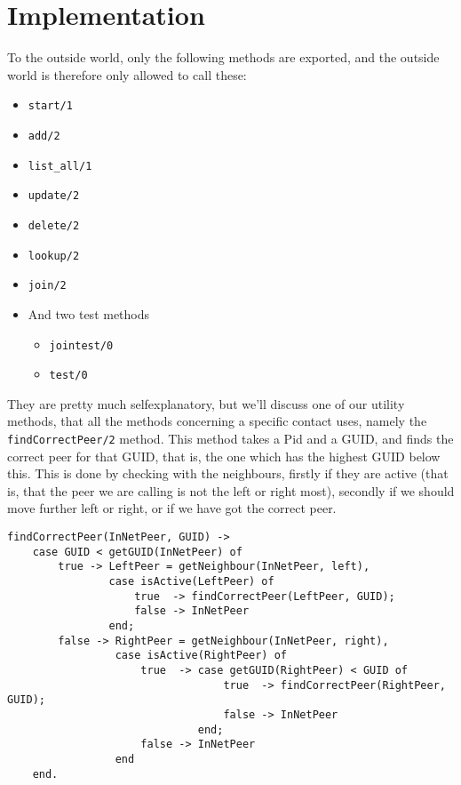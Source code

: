 \documentclass[10pt, a4paper]{article}
\begin{document}
\section{Implementation} %
\label{sec:implementation}
To the outside world, only the following methods are exported, and the outside world is therefore only allowed to call these:
\begin{itemize}
	\item \texttt{start/1}
	\item \texttt{add/2}
	\item \texttt{list\_all/1}
	\item \texttt{update/2}
	\item \texttt{delete/2}
	\item \texttt{lookup/2}
	\item \texttt{join/2}
	\item And two test methods
	\begin{itemize}
		\item \texttt{jointest/0}
		\item \texttt{test/0}
	\end{itemize}
\end{itemize}

They are pretty much selfexplanatory, but we'll discuss one of our utility methods, that all the methods concerning a specific contact uses, namely the \texttt{findCorrectPeer/2} method.
This method takes a Pid and a GUID, and finds the correct peer for that GUID, that is, the one which has the highest GUID below this.
This is done by checking with the neighbours, firstly if they are active (that is, that the peer we are calling is not the left or right most), secondly if we should move further left or right, or if we have got the correct peer.

\begin{lstlisting}
findCorrectPeer(InNetPeer, GUID) ->
    case GUID < getGUID(InNetPeer) of
        true -> LeftPeer = getNeighbour(InNetPeer, left),
                case isActive(LeftPeer) of
                    true  -> findCorrectPeer(LeftPeer, GUID);
                    false -> InNetPeer
                end;
        false -> RightPeer = getNeighbour(InNetPeer, right),
                 case isActive(RightPeer) of
                     true  -> case getGUID(RightPeer) < GUID of
                                  true  -> findCorrectPeer(RightPeer, GUID);
                                  false -> InNetPeer
                              end;
                     false -> InNetPeer
                 end
    end.
\end{lstlisting}
\end{document}

